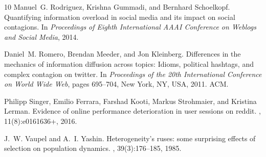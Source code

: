 \documentclass{svjour3}
\begin{document}
\begin{thebibliography}{10}
Manuel~G. Rodriguez, Krishna Gummadi, and Bernhard Schoelkopf.
\newblock Quantifying information overload in social media and its impact on
  social contagions.
\newblock In {\em Proceedings of Eighth International AAAI Conference on
  Weblogs and Social Media}, 2014.

Daniel~M. Romero, Brendan Meeder, and Jon Kleinberg.
\newblock Differences in the mechanics of information diffusion across topics:
  Idioms, political hashtags, and complex contagion on twitter.
\newblock In {\em Proceedings of the 20th International Conference on World
  Wide Web}, pages 695--704, New York, NY, USA, 2011. ACM.

Philipp Singer, Emilio Ferrara, Farshad Kooti, Markus Strohmaier, and Kristina
  Lerman.
\newblock Evidence of online performance deterioration in user sessions on
  reddit.
, 11(8):e0161636+, 2016.

J.~W. Vaupel and A.~I. Yashin.
\newblock Heterogeneity's ruses: some surprising effects of selection on
  population dynamics.
, 39(3):176--185, 1985.

\end{thebibliography}
\end{document}
